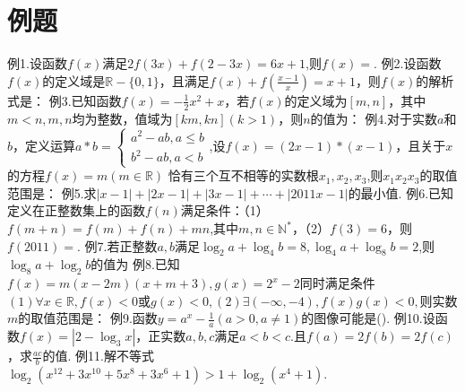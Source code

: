\documentclass{article}
\begin{document}
\section{例题}
例1.设函数$f(x)$满足$2f(3x)+f(2-3x)=6x+1$,则$f(x)=$.\newline
\newline
例2.设函数$f(x)$的定义域是$\mathbb{R}-\{0,1\}$，且满足$f(x)+f(\frac{x-1}{x})=x+1$，则$f(x)$的解析式是：\newline
\newline
例3.已知函数$f(x) = -\frac{1}{2}x^2+x$，若$f(x)$的定义域为$[m,n]$，其中$m < n, m, n$均为整数，值域为$[km,kn](k > 1)$，则$n$的值为：\newline
\newline
例4.对于实数$a$和$b$，定义运算$a * b = \left\{\begin{matrix}a^2 - ab,a \leq b   \\b^2 - ab,a < b\end{matrix}\right.$,设$f(x) = (2x-1)*(x-1)$，且关于$x$的方程$f(x) = m(m \in \mathbb{R})$
恰有三个互不相等的实数根$x_1,x_2,x_3$,则$x_1x_2x_3$的取值范围是：\newline
\newline
例5.求$|x-1|+|2x-1|+|3x-1|+ \cdots + |2011x-1|$的最小值.\newline
\newline
例6.已知定义在正整数集上的函数$f(n)$满足条件：（1）$f(m+n) = f(m) + f(n) + mn$,其中$m,n \in \mathbb{N}^*$，（2）$f(3) = 6$，则$f(2011) = $.\newline
\newline
例7.若正整数$a,b$满足$\log_{ 2}a + \log_{4}b = 8 ,\log_{4}a + \log_{8}b = 2$,则$\log_{8}a + \log_{ 2}b $的值为\newline
\newline
例8.已知$f(x) = m(x - 2m)(x + m +3),g(x) = 2^x - 2$同时满足条件$(1)\forall x \in \mathbb{R}, f(x) < 0$或$g(x) < 0,(2) \exists (-\infty,-4),f(x)g(x) < 0,$则实数$m$的取值范围是：\newline
\newline
例9.函数$y = a^x - \frac{1}{a}(a>0,a \ne 1)$的图像可能是().\newline
\newline
例10.设函数$f(x) = |2 - \log_{3}x|$，正实数$a,b,c$满足$a<b<c$.且$f(a) = 2f(b) = 2f(c)$，求$\frac{ac}{b}$的值.\newline
\newline
例11.解不等式$\log_{2}(x^{12}+3x^{10}+5x^{8}+3x^6+1) > 1 + \log_{2}(x^4+1)$.
\end{document}

